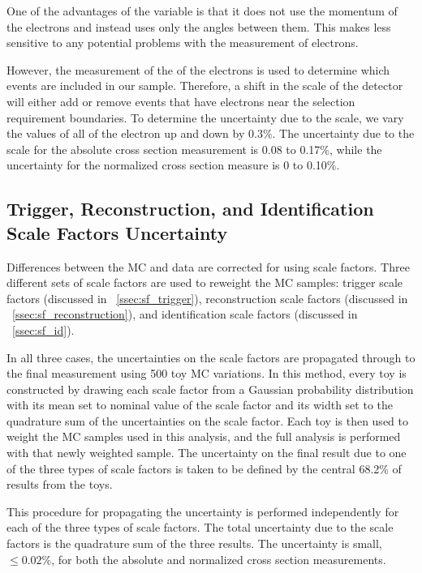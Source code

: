 One of the advantages of the \phistar variable is that it does not use the
momentum of the electrons and instead uses only the angles between them. This
makes \phistar less sensitive to any potential problems with the \pt
measurement of electrons.

However, the measurement of the \pt of the electrons is used to determine which
events are included in our sample. Therefore, a shift in the \pt scale of the
detector will either add or remove events that have electrons near the \pt
selection requirement boundaries. To determine the uncertainty due to the \pt
scale, we vary the \pt values of all of the electron up and down by 0.3\%.
 The uncertainty due to the \pt scale for the absolute cross section
measurement is 0.08 to 0.17\%, while the uncertainty for the normalized cross
section measure is 0 to 0.10\%.

\subsection{Trigger, Reconstruction, and Identification Scale Factors Uncertainty}
\label{scale_factor_uncertainty}

Differences between the MC and data are corrected for using scale factors.
Three different sets of scale factors are used to reweight the MC samples:
trigger scale factors (discussed in \SEC~\ref{ssec:sf_trigger}), reconstruction
scale factors (discussed in \SEC~\ref{ssec:sf_reconstruction}), and
identification scale factors (discussed in \SEC~\ref{ssec:sf_id}).

In all three cases, the uncertainties on the scale factors are propagated
through to the final measurement using 500 toy MC variations. In this method,
every toy is constructed by drawing each scale factor from a Gaussian
probability distribution with its mean set to nominal value of the scale factor
and its width set to the quadrature sum of the uncertainties on the scale
factor. Each toy is then used to weight the MC samples used in this analysis,
and the full analysis is performed with that newly weighted sample. The
uncertainty on the final result due to one of the three types of scale factors
is taken to be defined by the central 68.2\% of results from the toys.

This procedure for propagating the uncertainty is performed independently for
each of the three types of scale factors. The total uncertainty due to the
scale factors is the quadrature sum of the three results. The uncertainty is
small, $\le 0.02\%$, for both the absolute and normalized cross section
measurements.

